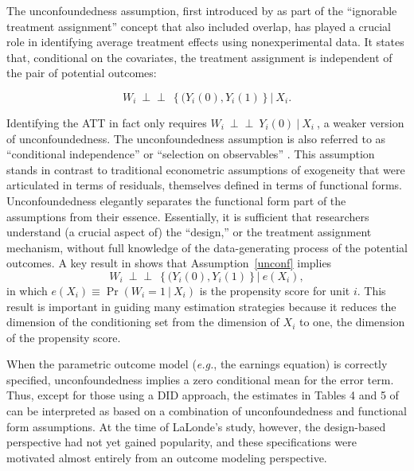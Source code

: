 \documentclass[letterpaper,12pt,leqno]{article}
\newcommand{\indep}{\perp\!\!\!\perp}
\begin{document}
The unconfoundedness assumption, first introduced by \citet{rosenbaum1983central} as part of the ``ignorable treatment assignment''  concept that also included overlap, has played a crucial role in identifying average treatment effects using nonexperimental data. It states that, conditional on the covariates, the treatment assignment is independent of the pair of potential outcomes:
\begin{assumption}[Unconfoundedness]
\label{unconf}
\[W_i\ 
\indep\
\left\{(Y_i(0),Y_i(1)\right\} |\ X_i.\]
\end{assumption}
\noindent Identifying the ATT in fact only requires $W_i\ \indep\ Y_i(0)\ |\ X_i\ $, a weaker version of unconfoundedness. The unconfoundedness assumption is also referred to as ``conditional independence'' \citep{lechner1999earnings, lechner2002program} or ``selection on observables'' \citep{barnow1980issues}. 
This assumption stands in contrast to traditional econometric  assumptions of exogeneity that were articulated in terms of residuals, themselves defined in terms of functional forms. Unconfoundedness elegantly separates the functional form part of the assumptions from their essence. Essentially, it is sufficient that researchers understand (a crucial aspect of) the ``design,'' or the treatment assignment mechanism, without full knowledge of the data-generating process of the potential outcomes. A key result in 
\citet{rosenbaum1983central}  shows that Assumption~\ref{unconf} implies
\[W_i\  \indep\ \left\{(Y_i(0),Y_i(1)\right\} |\ e(X_i),\]
in which $e(X_i) \equiv \Pr(W_i = 1\ |\ X_i)$ is the propensity score for unit $i$. This result is important in guiding many estimation strategies because it reduces the dimension of the conditioning set from the dimension of $X_i$ to one, the dimension of the propensity score. 

When the parametric outcome model ({\it e.g.}, the earnings equation) is correctly specified, unconfoundedness implies a zero conditional mean for the error term. Thus, except for those using a DID approach, the estimates in Tables 4 and 5 of \citet{LaLonde} can be interpreted as based on a combination of unconfoundedness and functional form assumptions. At the time of LaLonde's study, however, the design-based perspective had not yet gained popularity, and these specifications were motivated almost entirely from an outcome modeling perspective. 
\end{document}
